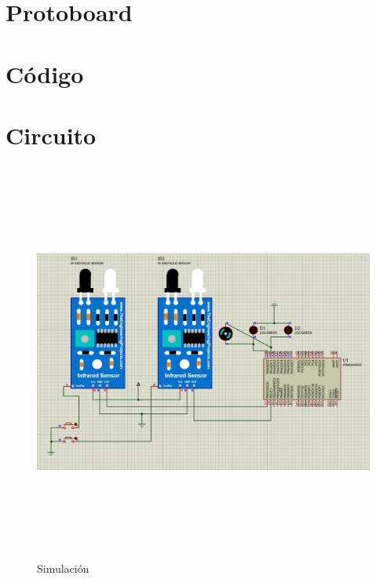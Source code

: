 \documentclass{article}
\begin{document}
\maketitle
\tableofcontents
\newpage
\section{Protoboard}
\newpage
\section{Código}

\newpage
\section{Circuito}
\begin{figure}[htpb!]
	\centering
	\caption{Simulación}
	\includegraphics[height=500px, width=500px]{img/sym}
\end{figure}
\end{document}
